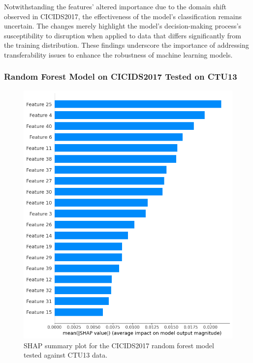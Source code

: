 Notwithstanding the features' altered importance due to the domain shift observed in CICIDS2017, the effectiveness of the model's classification remains uncertain. The changes merely highlight the model's decision-making process's susceptibility to disruption when applied to data that differs significantly from the training distribution. These findings underscore the importance of addressing transferability issues to enhance the robustness of machine learning models.

\subsubsection{Random Forest Model on CICIDS2017 Tested on CTU13}\label{subsec:rf-cicids2017-ctu13}

\begin{figure}[H]
\centering
\includegraphics[width=\textwidth]{img/SHAP_RFCICIDS2017_CTU13.png}
\caption{SHAP summary plot for the CICIDS2017 random forest model tested against CTU13 data.}\label{fig:shap_rfc_cicids2017_ctu13}
\end{figure}

